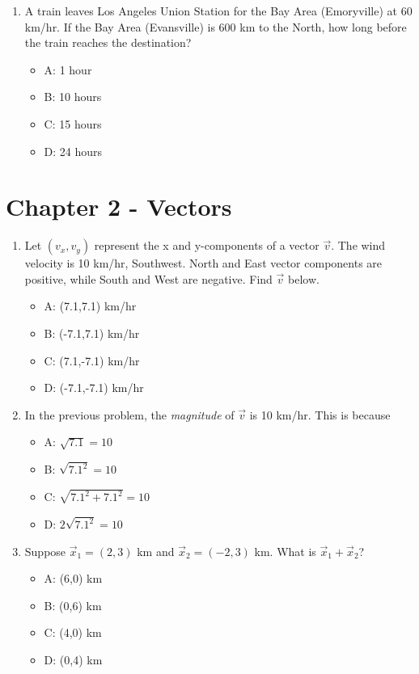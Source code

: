 \documentclass{article}
\begin{document}
\begin{enumerate}
\item A train leaves Los Angeles Union Station for the Bay Area (Emoryville) at 60 km/hr.  If the Bay Area (Evansville) is 600 km to the North, how long before the train reaches the destination?
\begin{itemize}
\item A: 1 hour
\item B: 10 hours
\item C: 15 hours
\item D: 24 hours
\end{itemize}
\end{enumerate}

\section{Chapter 2 - Vectors}

\begin{enumerate}
\item Let $(v_x,v_y)$ represent the x and y-components of a vector $\vec{v}$.  The wind velocity is 10 km/hr, Southwest.  North and East vector components are positive, while South and West are negative.  Find $\vec{v}$ below.
\begin{itemize}
\item A: (7.1,7.1) km/hr
\item B: (-7.1,7.1) km/hr
\item C: (7.1,-7.1) km/hr
\item D: (-7.1,-7.1) km/hr
\end{itemize}
\item In the previous problem, the \textit{magnitude} of $\vec{v}$ is 10 km/hr.  This is because
\begin{itemize}
\item A: $\sqrt{7.1} = 10$
\item B: $\sqrt{7.1^2} = 10$
\item C: $\sqrt{7.1^2 + 7.1^2} = 10$
\item D: $2\sqrt{7.1^2} = 10$
\end{itemize}
\item Suppose $\vec{x}_1 = (2,3)$ km and $\vec{x}_2 = (-2,3)$ km.  What is $\vec{x}_1 + \vec{x}_2$?
\begin{itemize}
\item A: (6,0) km
\item B: (0,6) km
\item C: (4,0) km
\item D: (0,4) km
\end{itemize}
\end{enumerate}
\end{document}
